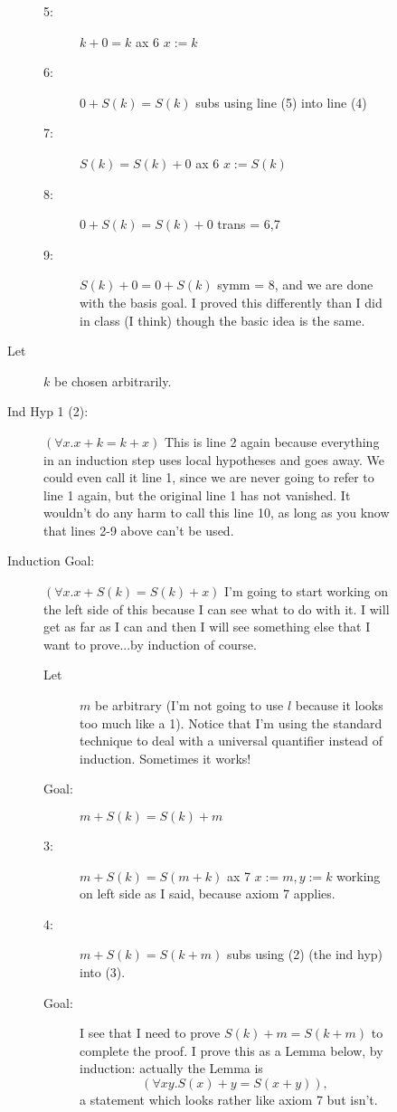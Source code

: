 \documentclass[12pt]{article}
\begin{document}
\begin{description}
\begin{description}
\begin{description}
\begin{description}
\item[5:]  $k+0=k$  ax 6 $x:=k$

\item[6:]  $0+S(k)=S(k)$  subs using line (5) into line (4)

\item[7:]  $S(k)=S(k)+0$  ax 6 $x:=S(k)$

\item[8:]  $0+S(k)=S(k)+0$  trans = 6,7

\item[9:]  $S(k)+0 = 0+S(k)$  symm = 8, and we are done with the basis goal.  I proved this differently than I did in class (I think) though the basic idea is the same.


\end{description}

\item[Let] $k$ be chosen arbitrarily.

\item[Ind Hyp 1 (2):]  $(\forall x.x+k=k+x)$  This is line 2 again because everything in an induction step uses local hypotheses and goes away.  We could even call it line 1, since we are never going to refer to line 1 again, but the original line
1 has not vanished.  It wouldn't do any harm to call this line 10, as long as you know that lines 2-9 above can't be used.

\item[Induction Goal:]  $(\forall x.x+S(k)=S(k)+x)$  I'm going to start working on the left side of this because I can see what to do with it.  I will get as far as I can and then I will see something else that I want to prove...by induction of course.
\begin{description}
\item[Let] $m$ be arbitrary (I'm not going to use $l$ because it looks too much like a 1).  Notice that I'm using the standard technique to deal with a universal quantifier instead of induction.  Sometimes it works!

\item[Goal:]  $m+S(k)=S(k)+m$

\item[3:]  $m+S(k) = S(m+k)$  ax 7 $x:=m, y:=k$  working on left side as I said, because axiom 7 applies.

\item[4:]  $m+S(k)=S(k+m)$  subs using (2) (the ind hyp) into (3).

\item[Goal:]  I see that I need to prove $S(k)+m = S(k+m)$ to complete the proof.  I prove this as a Lemma below, by induction:  actually the Lemma is $$(\forall xy.S(x)+y=S(x+y)),$$a statement which looks rather like axiom 7 but isn't.


\end{description}
\end{description}
\end{description}
\end{description}
\end{document}
